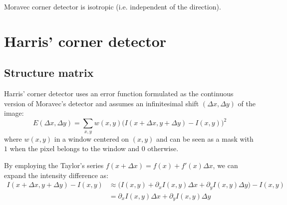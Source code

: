 \begin{remark}
    Moravec corner detector is isotropic (i.e. independent of the direction).
\end{remark}



\section{Harris' corner detector}

\subsection{Structure matrix}

Harris' corner detector uses an error function formulated as the continuous version of Moravec's detector and 
assumes an infinitesimal shift $(\Delta x, \Delta y)$ of the image:
\[ E(\Delta x, \Delta y) = \sum_{x, y} w(x, y) \big( I(x+\Delta x, y+\Delta y) - I(x, y) \big)^2 \]
where $w(x, y)$ in a window centered on $(x, y)$ and can be seen as a mask with $1$ when the pixel belongs to the window and $0$ otherwise.

By employing the Taylor's series $f(x + \Delta x) = f(x) + f'(x) \Delta x$,
we can expand the intensity difference as:
\[ 
    \begin{split}
        I(x+\Delta x, y+\Delta y) - I(x, y) &\approx \big( I(x, y) + \partial_x I(x, y)\Delta x + \partial_y I(x, y)\Delta y \big) - I(x, y) \\
        &= \partial_x I(x, y)\Delta x + \partial_y I(x, y)\Delta y
    \end{split}
\]


